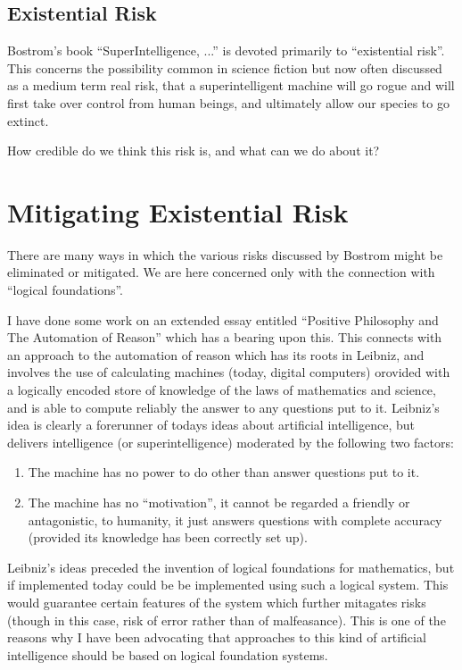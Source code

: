 \documentclass[12pt,titlepage]{article}
\begin{document}
\subsection{Existential Risk}

Bostrom's book ``SuperIntelligence, ...'' is devoted primarily to ``existential risk''.
This concerns the possibility common in science fiction but now often discussed as a medium term real risk, that a superintelligent machine will go rogue and will first take over control from human beings, and ultimately allow our species to go extinct.

How credible do we think this risk is, and what can we do about it?

\pagebreak

\section{Mitigating Existential Risk}

There are many ways in which the various risks discussed by Bostrom might be eliminated or mitigated.
We are here concerned only with the connection with ``logical foundations''.

I have done some work on an extended essay entitled ``Positive Philosophy and The Automation of Reason'' which has a bearing upon this.
This connects with an approach to the automation of reason which has its roots in Leibniz, and involves the use of calculating machines (today, digital computers) orovided with a logically encoded store of knowledge of the laws of mathematics and science, and is able to compute reliably the answer to any questions put to it.
Leibniz's idea is clearly a forerunner of todays ideas about artificial intelligence, but delivers intelligence (or superintelligence) moderated
by the following two factors:

\begin{enumerate}
\item The machine has no power to do other than answer questions put to it.
\item The machine has no ``motivation'', it cannot be regarded a friendly or antagonistic, to humanity, it just answers questions with complete accuracy (provided its knowledge has been correctly set up).
\end{enumerate}

Leibniz's ideas preceded the invention of logical foundations for mathematics, but if implemented today could be be implemented using such a logical system.
This would guarantee certain features of the system which further mitagates risks (though in this case, risk of error rather than of malfeasance).
This is one of the reasons why I have been advocating that approaches to this kind of artificial intelligence should be based on logical foundation systems.
\end{document}
